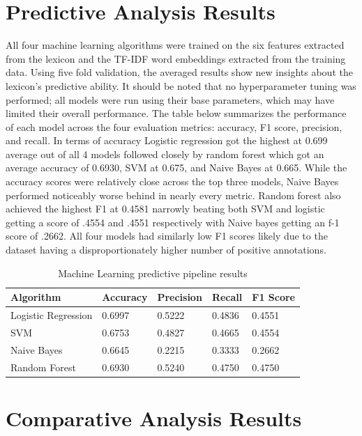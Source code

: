\section{Predictive Analysis Results}

All four machine learning algorithms were trained on the six features extracted from the lexicon and the TF-IDF word embeddings extracted from the training data. Using five fold validation, the averaged results show new insights about the lexicon’s predictive ability. It should be noted that no hyperparameter tuning was performed; all models were run using their base parameters, which may have limited their overall performance. The table below summarizes the performance of each model across the four evaluation metrics: accuracy, F1 score, precision, and recall. In terms of accuracy Logistic regression got the highest at 0.699 average out of all 4 models followed closely by random forest which got an average accuracy of 0.6930, SVM at 0.675, and Naive Bayes at 0.665. While the accuracy scores were relatively close across the top three models, Naive Bayes performed noticeably worse behind in nearly every metric. Random forest also achieved the highest F1 at 0.4581 narrowly beating both SVM and logistic getting a score of .4554 and .4551 respectively with Naive bayes getting an f-1 score of .2662. All four models had similarly low F1 scores likely due to the dataset having a disproportionately higher number of positive annotations.

\begin{table}
	\centering
	\begin{tabular}{|m{9em} |m{5em} |m{5em} |m{5em} |m{5em} |}
		\hline
		Algorithm & Accuracy & Precision & Recall & F1 Score \\ [0.5ex]
		\hline
		Logistic Regression & 0.6997 & 0.5222 & 0.4836 & 0.4551 \\
		\hline
		SVM & 0.6753 & 0.4827 & 0.4665 & 0.4554\\
		\hline
		Naive Bayes & 0.6645 & 0.2215 & 0.3333 & 0.2662 \\
		\hline
		Random Forest & 0.6930 & 0.5240 & 0.4750 & 0.4750 \\
		\hline
	\end{tabular}
	\caption{Machine Learning predictive pipeline results}
\end{table}

\section{Comparative Analysis Results}


